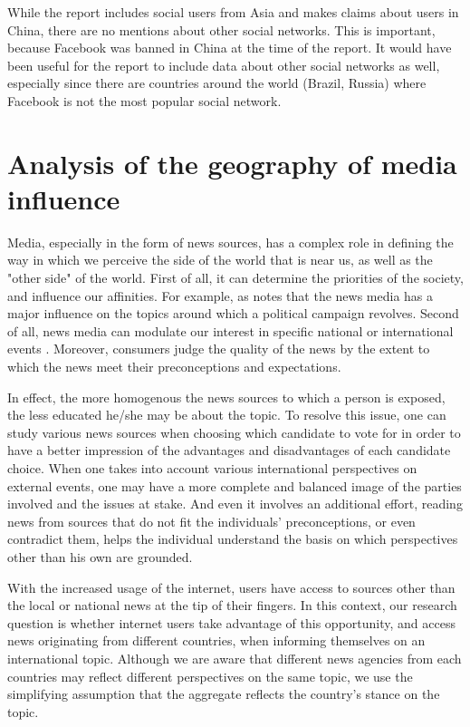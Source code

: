 \documentclass{acm_proc_10ptArticle-sp}
\begin{document}
While the report includes social users from Asia and makes claims about users in China, there are no mentions about other social networks. This is important, because Facebook was banned in China at the time of the report. It would have been useful for the report to include data about other social networks as well, especially since there are countries around the world (Brazil, Russia) where Facebook is not the most popular social network.


\section{Analysis of the geography of media influence}

Media, especially in the form of news sources, has a complex role in defining the way in which we perceive the side of the world that is near us, as well as the "other side" of the world. First of all, it can determine the priorities of the society, and influence our affinities. For example, as   notes that the news media has a major influence on the topics around which a political campaign revolves. Second of all, news media can modulate our interest in specific national or international events \cite{wanta2004agenda}. Moreover, consumers judge the quality of the news by the extent to which the news meet their preconceptions and expectations\cite{gentzkow2005media}. 

In effect, the more homogenous the news sources to which a person is exposed, the less educated he/she may be about the topic. To resolve this issue, one can study various news sources when choosing which candidate to vote for in order to have a better impression of the advantages and disadvantages of each candidate choice. When one takes into account various international perspectives on external events, one may have a more complete and balanced image of the parties involved and the issues at stake. And even it involves an additional effort, reading news from sources that do not fit the individuals' preconceptions, or even contradict them, helps the individual understand the basis on which perspectives other than his own are grounded.

With the increased usage of the internet, users have access to sources other than the local or national news at the tip of their fingers. In this context, our research question is whether internet users take advantage of this opportunity, and access news originating from different countries, when informing themselves on an international topic. Although we are aware that different news agencies from each countries may reflect different perspectives on the same topic, we use the simplifying assumption that the aggregate reflects the country's stance on the topic.
\end{document}
